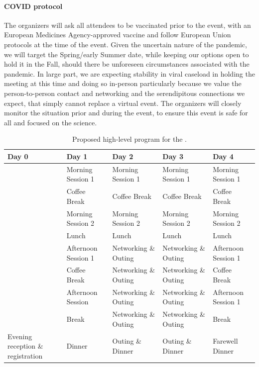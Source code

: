 \paragraph{COVID protocol} The organizers will ask all attendees to be
vaccinated prior to the event, with an European Medicines
Agency-approved vaccine and follow European Union protocols at the time
of the event. Given the uncertain nature of the pandemic, we will target
the Spring/early Summer date, while keeping our options open to hold it
in the Fall, should there be unforeseen circumstances associated with
the pandemic. In large part, we are expecting stability in viral
caseload in holding the meeting at this time and doing so in-person
particularly because we value the person-to-person contact and
networking and the serendipitous connections we expect, that simply
cannot replace a virtual event. The organizers will closely monitor the
situation prior and during the event, to ensure this event is safe for
all and focused on the science.

\begin{table}[!t]
  \centering
  \begin{tabular}{|p{2.5cm}|p{2.5cm}|p{2.5cm}|p{2.5cm}|p{2.5cm}|}
    \hline 
    \rowcolor{Gray}
    \bfseries Day 0& \bfseries Day 1&\bfseries Day 2 &\bfseries Day 3 &\bfseries Day 4\\
    \hline
                   &Morning Session 1&Morning Session 1&Morning Session 1&Morning Session 1\\
    \hline
                   &Coffee Break&Coffee Break&Coffee Break&Coffee Break\\
    \hline    
                   &Morning Session 2&Morning Session 2&Morning Session 2&Morning Session 2\\
    \hline
                   &Lunch&Lunch&Lunch&Lunch\\
    \hline
                   &Afternoon Session 1&Networking \& Outing&Networking \& Outing&Afternoon Session 1\\
    \hline
                   &Coffee Break&Networking \& Outing&Networking \& Outing&Coffee Break\\
    \hline
                   &Afternoon Session &Networking \& Outing&Networking \& Outing&Afternoon Session 1\\
    \hline
                   &Break&Networking \& Outing&Networking \& Outing&Break\\
    \hline
    Evening reception \& registration&Dinner&Outing \& Dinner&Outing \&
                                                               Dinner&Farewell Dinner\\
    \hline        
  \end{tabular}
  \caption{Proposed high-level program for the \sympe.}
  \label{tab:symp}
\end{table}

